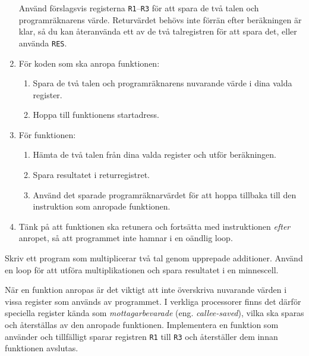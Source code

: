 \begin{Extrauppgifter}
\begin{enumerate}
              Använd förslagsvis registerna \texttt{R1}--\texttt{R3} för att spara de två talen och programräknarens värde. Returvärdet behövs inte förrän efter beräkningen är klar, så du kan återanvända ett av de två talregistren för att spara det, eller använda \texttt{RES}.
        \item För koden som ska anropa funktionen:
              \begin{enumerate}
                  \item Spara de två talen och programräknarens nuvarande värde i dina valda register.
                  \item Hoppa till funktionens startadress.
              \end{enumerate}
        \item För funktionen:
              \begin{enumerate}
                  \item Hämta de två talen från dina valda register och utför beräkningen.
                  \item Spara resultatet i returregistret.
                  \item Använd det sparade programräknarvärdet för att hoppa tillbaka till den instruktion som anropade funktionen.
              \end{enumerate}
        \item Tänk på att funktionen ska retunera och fortsätta med instruktionen \emph{efter} anropet, så att programmet inte hamnar i en oändlig loop.

    \end{enumerate}

    \item {} Skriv ett program som multiplicerar två tal genom upprepade additioner. Använd en loop för att utföra multiplikationen och spara resultatet i en minnescell.

    \item {} När en funktion anropas är det viktigt att inte överskriva nuvarande värden i vissa register som används av programmet. I verkliga processorer finns det därför speciella register kända som \emph{mottagarbevarade} (eng. \emph{callee-saved}), vilka ska sparas och återställas av den anropade funktionen. Implementera en funktion som använder och tillfälligt sparar registren \texttt{R1} till \texttt{R3} och återställer dem innan funktionen avslutas.



\end{Extrauppgifter}
